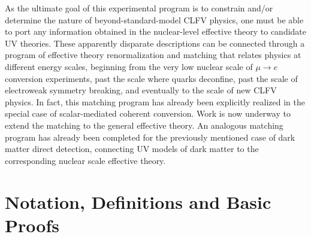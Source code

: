 \documentclass{book}[letterpaper,12pt]
\begin{document}
As the ultimate goal of this experimental program is to constrain and/or determine the nature of beyond-standard-model CLFV physics, one must be able to port any information obtained in the nuclear-level effective theory to candidate UV theories. These apparently disparate descriptions can be connected through a program of effective theory renormalization and matching that relates physics at different energy scales, beginning from the very low nuclear scale of $\mu\rightarrow e$ conversion experiments, past the scale where quarks deconfine, past the scale of electroweak symmetry breaking, and eventually to the scale of new CLFV physics. In fact, this matching program has already been explicitly realized in the special case of scalar-mediated coherent conversion. Work is now underway to extend the matching to the general effective theory. An analogous matching program has already been completed for the previously mentioned case of dark matter direct detection, connecting UV models of dark matter to the corresponding nuclear scale effective theory. 




\appendix
\chapter{Notation, Definitions and Basic Proofs}
\thispagestyle{headings}
\end{document}
